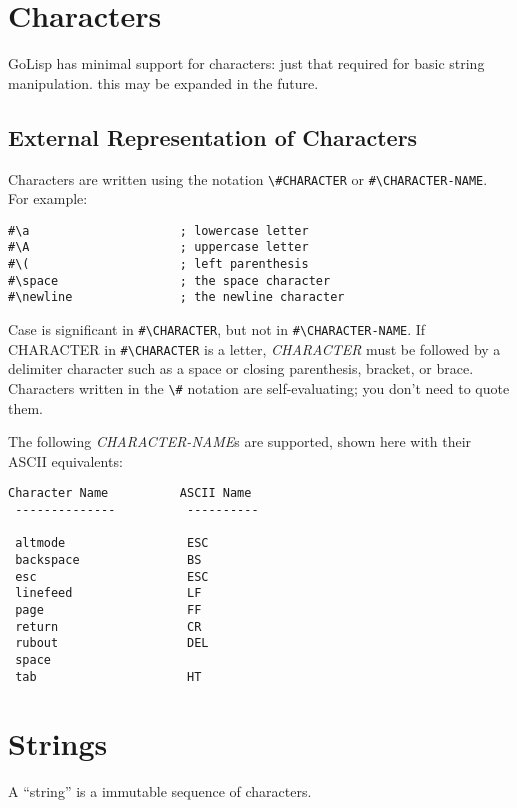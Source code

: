\documentclass{article}
\begin{document}
\section{Characters}\label{sec:characters}

GoLisp has minimal support for characters: just that required for basic string manipulation.
this may be expanded in the future.

\subsection{External Representation of Characters}\label{sec:external-representation-of-characters}

Characters are written using the notation \verb|\#CHARACTER| or \verb|#\CHARACTER-NAME|. For
example:

\begin{verbatim}
#\a                     ; lowercase letter
#\A                     ; uppercase letter
#\(                     ; left parenthesis
#\space                 ; the space character
#\newline               ; the newline character
\end{verbatim}

Case is significant in \verb|#\CHARACTER|, but not in
\verb|#\CHARACTER-NAME|. If CHARACTER in
\verb|#\CHARACTER| is a letter, \emph{CHARACTER} must be followed by a
delimiter character such as a space or closing parenthesis, bracket, or brace. Characters
written in the \verb|\#| notation are self-evaluating; you don't need to quote them.

The following \emph{CHARACTER-NAME}s are supported, shown here with their ASCII equivalents:

\begin{verbatim}
Character Name          ASCII Name
 --------------          ----------

 altmode                 ESC
 backspace               BS
 esc                     ESC
 linefeed                LF
 page                    FF
 return                  CR
 rubout                  DEL
 space
 tab                     HT
\end{verbatim}

\section{Strings}\label{sec:strings}

A ``string'' is a immutable sequence of characters.
\end{document}
